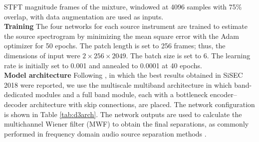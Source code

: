 \documentclass[final]{cvpr}
\begin{document}
STFT magnitude frames of the mixture, windowed at 4096 samples with 75\% overlap, with data augmentation \cite{Uhlich17} are used as inputs. 
\vspace{3mm}\\
\textbf{Training} \hspace{1mm}
The four networks for each source instrument are trained to estimate the source spectrogram by minimizing the mean square error with the Adam optimizer for 50 epochs. The patch length is set to 256 frames; thus, the dimensions of input were $2\times256\times2049$. The batch size is set to 6. The learning rate is initially set to 0.001 and annealed to 0.0001 at 40 epochs.
\vspace{3mm}\\
\textbf{Model architecture} \hspace{1mm}
Following \cite{Takahashi17,Takahashi18MMDenseLSTM}, in which the best results obtained in SiSEC 2018 were reported, we use the multiscale multiband architecture in which band-dedicated modules and a full band module, each with a bottleneck encoder--decoder architecture with skip connections, are placed. The network configuration is shown in Table \ref{tab:d3arch}. The network outputs are used to calculate the multichannel Wiener filter (MWF) to obtain the final separations, as commonly performed in frequency domain audio source separation methods \cite{Takahashi18MMDenseLSTM, Uhlich17, Liu19, Samuel20}.
\begin{table}[t]
\caption{\label{tab:mss} SDRs for MUSDB18 dataset. 
'*' denotes the method operating in the time domain.}
\vspace{2mm}
\end{table}
\end{document}
